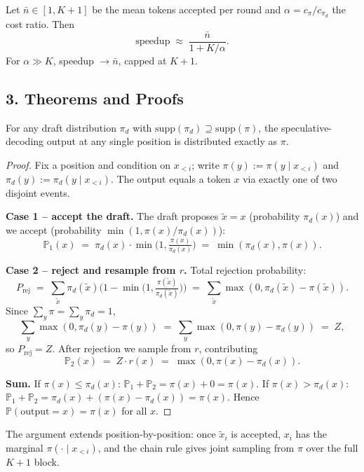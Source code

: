 \begin{remark}
Let $\bar n \in [1, K+1]$ be the mean tokens accepted per round and $\alpha = c_\pi / c_{\pi_d}$ the cost ratio. Then
\[
\text{speedup} \;\approx\; \frac{\bar n}{1 + K/\alpha}.
\]
For $\alpha \gg K$, speedup $\to \bar n$, capped at $K+1$.
\end{remark}

\subsection*{3. Theorems and Proofs}

\begin{theorem}\label{thm:correctness}
For any draft distribution $\pi_d$ with $\mathrm{supp}(\pi_d) \supseteq \mathrm{supp}(\pi)$, the speculative-decoding output at any single position is distributed exactly as $\pi$.
\end{theorem}

\begin{proof}
Fix a position and condition on $x_{<i}$; write $\pi(y) := \pi(y \mid x_{<i})$ and $\pi_d(y) := \pi_d(y \mid x_{<i})$. The output equals a token $x$ via exactly one of two disjoint events.

\textbf{Case 1 -- accept the draft.} The draft proposes $\tilde x = x$ (probability $\pi_d(x)$) and we accept (probability $\min(1, \pi(x)/\pi_d(x))$):
\[
\mathbb{P}_1(x) \;=\; \pi_d(x) \cdot \min\!\Big(1, \tfrac{\pi(x)}{\pi_d(x)}\Big) \;=\; \min(\pi_d(x), \pi(x)).
\]

\textbf{Case 2 -- reject and resample from $r$.} Total rejection probability:
\[
P_{\text{rej}} \;=\; \sum_{\tilde x} \pi_d(\tilde x)\Big(1 - \min\!\big(1, \tfrac{\pi(\tilde x)}{\pi_d(\tilde x)}\big)\Big) \;=\; \sum_{\tilde x} \max(0, \pi_d(\tilde x) - \pi(\tilde x)).
\]
Since $\sum_y \pi = \sum_y \pi_d = 1$,
\[
\sum_y \max(0, \pi_d(y) - \pi(y)) \;=\; \sum_y \max(0, \pi(y) - \pi_d(y)) \;=\; Z,
\]
so $P_{\text{rej}} = Z$. After rejection we sample from $r$, contributing
\[
\mathbb{P}_2(x) \;=\; Z \cdot r(x) \;=\; \max(0, \pi(x) - \pi_d(x)).
\]

\textbf{Sum.} If $\pi(x) \le \pi_d(x)$: $\mathbb{P}_1 + \mathbb{P}_2 = \pi(x) + 0 = \pi(x)$. If $\pi(x) > \pi_d(x)$: $\mathbb{P}_1 + \mathbb{P}_2 = \pi_d(x) + (\pi(x) - \pi_d(x)) = \pi(x)$. Hence $\mathbb{P}(\text{output}=x) = \pi(x)$ for all $x$. \qedhere
\end{proof}

The argument extends position-by-position: once $\tilde x_i$ is accepted, $x_i$ has the marginal $\pi(\cdot \mid x_{<i})$, and the chain rule gives joint sampling from $\pi$ over the full $K{+}1$ block.

